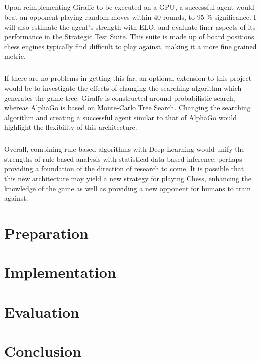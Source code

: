 \documentclass[a4paper]{book}
\begin{document}
\paragraph{}Upon reimplementing Giraffe to be executed on a GPU, a successful agent would beat an opponent playing random moves within 40 rounds, to 95 \% significance. I will also estimate the agent's strength with ELO, and evaluate finer aspects of its performance in the Strategic Test Suite. This suite is made up of board positions chess engines typically find difficult to play against, making it a more fine grained metric. \cite{sts}

\paragraph{}If there are no problems in getting this far, an optional extension to this project would be to investigate the effects of changing the searching algorithm which generates the game tree. Giraffe is constructed around probabilistic search, whereas AlphaGo is based on Monte-Carlo Tree Search. \cite{giraffe} \cite{AlphaGo} Changing the searching algorithm and creating a successful agent similar to that of AlphaGo would highlight the flexibility of this architecture.

\paragraph{}Overall, combining rule based algorithms with Deep Learning would unify the strengths of rule-based analysis with statistical data-based inference, perhaps providing a foundation of the direction of research to come. It is possible that this new architecture may yield a new strategy for playing Chess, enhancing the knowledge of the game as well as providing a new opponent for humans to train against.


\chapter{Preparation}
\chapter{Implementation}
\chapter{Evaluation}
\chapter{Conclusion}
\end{document}
